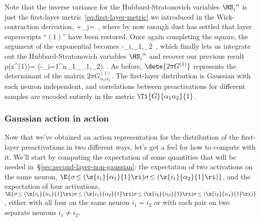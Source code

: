Note that  the inverse variance for the Hubbard-Stratonovich variables $\HS_{i}^{\ \alpha}$ is just the first-layer metric~\eqref{eq:first-layer-metric} we introduced in the Wick-contraction derivation,
\be
{}+\sum_{j}=\, ,
\ee
where by now enough dust has settled that layer superscripts  ``$(1)$'' have been restored.
Once again completing the square,
the argument of the exponential becomes
\be
-\sum_{i,\alpha_1,\alpha_2}\, ,
\ee
which finally lets us integrate out the Hubbard-Stratonovich variables $\HS_{i}^{\ \alpha}$ and recover our previous result
\be\label{eq:first-layer-distribution-HS-derivation}
p\!\le(z^{(1)}\Big\vert\D\ri)= \exp\!\le(-\sum_{i=1}^{n_1}\sum_{\alpha_1,\alpha_2\in\D}\ri)\, .
\ee
As before, $\dete{2\pi G^{(1)}}$ represents the determinant of the  matrix $2\pi G^{(1)}_{\alpha_1 \alpha_2}$.
The first-layer distribution is Gaussian with each neuron independent, and correlations between preactivations for different samples are encoded entirely in the metric $\Ti{G}{\alpha_1\alpha_2}{1}$. 

\subsubsection{Gaussian action in action}
Now that we've obtained an action representation for the distribution of the first-layer preactivations in two different ways, let's get a feel for how to compute with it. We'll start by computing the expectation of some quantities that will be needed in~\S\ref{sec:second-layer-non-gaussian}: the expectation of two activations on the same neuron, $\E{\sigma\!\le(\z{i_1}{\alpha_1}{1}\ri)\sigma\!\le(\z{i_1}{\alpha_2}{1}\ri)}$,  and the expectation of four activations, $\E{\sigma\!\le(\z{i_1}{\alpha_1}{1}\ri)\sigma\!\le(\z{i_1}{\alpha_2}{1}\ri)\sigma\!\le(\z{i_2}{\alpha_3}{1}\ri)\sigma\!\le(\z{i_2}{\alpha_4}{1}\ri)}$, either with all four on the same neuron $i_1=i_2$ or with each pair on two separate neurons $i_1\ne i_2$.


